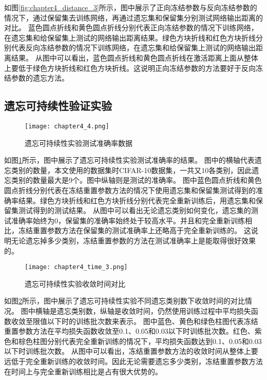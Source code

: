 如图\ref{fig:chapter4_distance_3}所示，图中展示了正向冻结参数与反向冻结参数的情况下，通过保留集去训练网络，再通过遗忘集和保留集分别测试网络输出距离的对比。
蓝色圆点折线和黄色圆点折线分别代表正向冻结参数的情况下训练网络，在遗忘集和给保留集上测试的网络输出距离结果。绿色方块折线和红色方块折线分别代表反向冻结参数的情况下训练网络，在遗忘集和给保留集上测试的网络输出距离结果。
从图中可以看出，蓝色圆点折线和黄色圆点折线在激活距离上面从整体上要低于绿色方块折线和红色方块折线。这说明正向冻结参数的方法要好于反向冻结参数的遗忘方法。
\subsection{遗忘可持续性验证实验}
\begin{figure}
    \centering
    \texttt{[image: chapter4\_4.png]}
    \caption{遗忘可持续性实验测试准确率数据}
    \label{fig:chapter4_4}
\end{figure}

如图\ref{fig:chapter4_4}所示，图中展示了遗忘可持续性实验测试准确率的结果。
图中的横轴代表遗忘类别的数量，本文使用的数据集时CIFAR-10数据集，一共又10各类别，因此遗忘类别的数量最大是9个。图中纵轴则是测试的准确率。
图中蓝色圆点折线和黄色圆点折线分别代表在冻结重置参数方法的情况下使用遗忘集和保留集测试得到的准确率结果。绿色方块折线和红色方块折线分别代表完全重新训练后，用遗忘集和保留集测试得到的测试结果。
从图中可以看出无论遗忘类别如何变化，遗忘集的测试准确率始终为0，保留集的准确率始终处于较高水平。并且和完全重新训练相比，冻结重置参数方法在保留集的测试准确率上还略高于完全重新训练的。
这说明无论遗忘掉多少类别，冻结重置参数的方法在测试准确率上是能取得很好效果的。

\begin{figure}
    \centering
    \texttt{[image: chapter4\_time\_3.png]}
    \caption{遗忘可持续性实验收敛时间对比}
    \label{fig:chapter4_time_3}
\end{figure}

如图\ref{fig:chapter4_time_3}所示，图中展示了遗忘可持续性实验不同遗忘类别数下收敛时间的对比情况。
图中横轴是遗忘类别数，纵轴是收敛时间，仍然使用训练过程中平均损失函数收敛至限值以下时的训练批次数来表示。
图中蓝色、黄色和绿色柱图代表冻结重置参数方法在平均损失函数收敛至0.1、0.05和0.03以下时训练批次数。红色、紫色和棕色柱图分别代表完全重新训练的情况下，平均损失函数达到0.1、0.05和0.03以下时训练批次数。
从图中可以看出，冻结重置参数方法的收敛时间从整体上要远低于完全重新训练的收敛时间。因此无论需要遗忘多少类别，冻结重置参数方法在时间上与完全重新训练相比是占有很大优势的。

